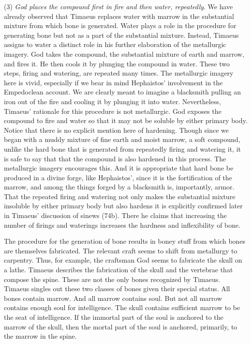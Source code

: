 (3) \emph{God places the compound first in fire and then water, repeatedly}. We have already observed that Timaeus replaces water with marrow in the substantial mixture from which bone is generated. Water plays a role in the procedure for generating bone but not as a part of the substantial mixture. Instead, Timaeus assigns to water a distinct role in his further elaboration of the metallurgic imagery. God takes the compound, the substantial mixture of earth and marrow, and fires it. He then cools it by plunging the compound in water. These two steps, firing and watering, are repeated many times. The metallurgic imagery here is vivid, especially if we bear in mind Hephaistos' involvement in the Empedoclean account. We are clearly meant to imagine a blacksmith pulling an iron out of the fire and cooling it by plunging it into water. Nevertheless, Timaeus' rationale for this procedure is not metallurgic. God exposes the compound to fire and water so that it may not be soluble by either primary body. Notice that there is no explicit mention here of hardening. Though since we began with a muddy mixture of fine earth and moist marrow, a soft compound, unlike the hard bone that is generated from repeatedly firing and watering it, it is safe to say that that the compound is also hardened in this process. The metallurgic imagery encourages this. And it is appropriate that hard bone be produced in a divine forge, like Hephaistos', since it is the fortification of the marrow, and among the things forged by a blacksmith is, importantly, armor. That the repeated firing and watering not only makes the substantial mixture insoluble by either primary body but also hardens it is explicitly confirmed later in Timaeus' discussion of sinews (74b). There he claims that increasing the number of firings and waterings increases the hardness and inflexibility of bone.

The procedure for the generation of bone results in boney stuff from which bones are themselves fabricated. The relevant craft seems to shift from metallurgy to carpentry. Thus, for example, the craftsman God seems to fabricate the skull on a lathe. Timaeus describes the fabrication of the skull and the vertebrae that compose the spine. These are not the only bones recognized by Timaeus. Timaeus singles out these two classes of bones given their special status. All bones contain marrow. And all marrow contains soul. But not all marrow contains enough soul for intelligence. The skull contains sufficient marrow to be the seat of intelligence. If the immortal part of the soul is anchored to the marrow of the skull, then the mortal part of the soul is anchored, primarily, to the marrow in the spine.

